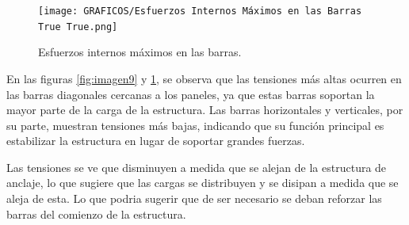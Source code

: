 \begin{figure}[H]
    \centering
    \texttt{[image: GRAFICOS/Esfuerzos Internos Máximos en las Barras True True.png]}
    \caption{Esfuerzos internos máximos en las barras.}
    \label{fig:imagen99}
\end{figure}

En las figuras \ref{fig:imagen9} y \ref{fig:imagen99}, se observa que las tensiones más altas ocurren en las barras diagonales cercanas a los paneles, ya que estas barras soportan la mayor parte de la carga de la estructura. Las barras horizontales y verticales, por su parte, muestran tensiones más bajas, indicando que su función principal es estabilizar la estructura en lugar de soportar grandes fuerzas.

Las tensiones se ve que disminuyen a medida que se alejan de la estructura de anclaje, lo que sugiere que las cargas se distribuyen y se disipan a medida que se aleja de esta. Lo que podria sugerir que de ser necesario se deban reforzar las barras del comienzo de la estructura.
